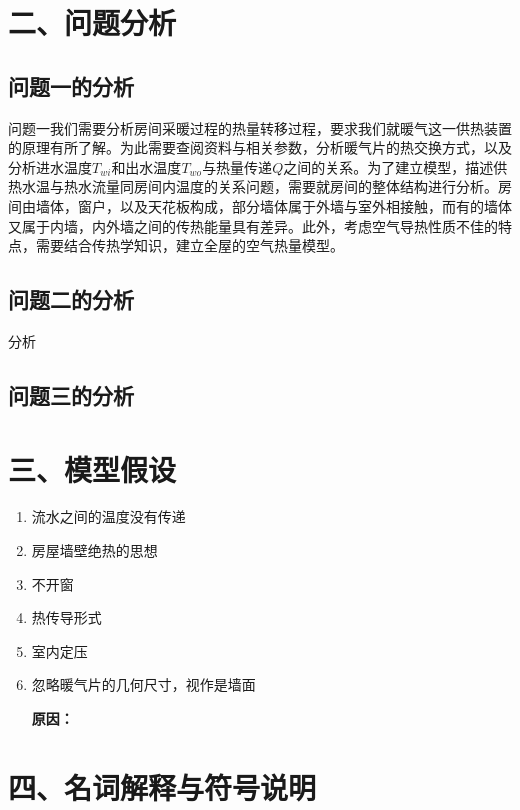 \documentclass{my_paper}
\begin{document}
\section{二、问题分析}
\subsection{问题一的分析}

问题一我们需要分析房间采暖过程的热量转移过程，要求我们就暖气这一供热装置的原理有所了解。为此需要查阅资料与相关参数，分析暖气片的热交换方式，以及分析进水温度$T_{wi}$和出水温度$ T_{wo} $与热量传递$Q$之间的关系。为了建立模型，描述供热水温与热水流量同房间内温度的关系问题，需要就房间的整体结构进行分析。房间由墙体，窗户，以及天花板构成，部分墙体属于外墙与室外相接触，而有的墙体又属于内墙，内外墙之间的传热能量具有差异。此外，考虑空气导热性质不佳的特点，需要结合传热学知识，建立全屋的空气热量模型。

\subsection{问题二的分析}

分析

\subsection{问题三的分析}


\section{三、模型假设}
\begin{enumerate}
    \item 流水之间的温度没有传递
    \item 房屋墙壁绝热的思想
    \item 不开窗
    \item 热传导形式
    \item 室内定压
    \item 忽略暖气片的几何尺寸，视作是墙面
    
    \textbf{原因：}


\end{enumerate}

\section{四、名词解释与符号说明}
\end{document}
